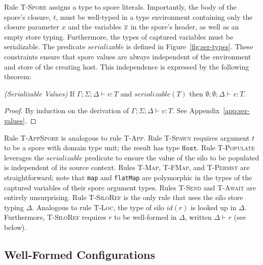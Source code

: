 Rule \textsc{T-Spore} assigns a type to spore literals. Importantly,
the body of the spore's closure, $t$, must be well-typed in a type
environment containing only the closure parameter $x$ and the
variables $\overline{x}$ in the spore's header, as well as an empty store
typing. Furthermore, the types of captured variables must be
serializable. The predicate $serializable$ is defined in
Figure~\ref{fig:ser-types}. These constraints ensure that spore values
are always independent of the environment and store of the creating
host. This independence is expressed by the following theorem:

\begin{thm}
\emph{(Serializable Values)}\label{lem:ser-values}
If $\Gamma ; \Sigma ; \Delta \vdash v : T$ and $serializable(T)$ then
$\emptyset ; \emptyset ; \Delta \vdash v : T$.
\end{thm}
\begin{proof}
By induction on the derivation of $\Gamma ; \Sigma ; \Delta \vdash v :
T$. See Appendix~\ref{app:ser-values}.
\end{proof}

Rule \textsc{T-AppSpore} is analogous to rule \textsc{T-App}. Rule
\textsc{T-Spawn} requires argument $t$ to be a spore with domain type
unit; the result has type $\texttt{Host}$.  Rule \textsc{T-Populate}
leverages the $serializable$ predicate to ensure the value of the silo
to be populated is independent of its source context. Rules
\textsc{T-Map}, \textsc{T-FMap}, and \textsc{T-Persist} are
straightforward; note that \verb|map| and \verb|flatMap| are
polymorphic in the types of the captured variables of their spore
argument types. Rules \textsc{T-Send} and \textsc{T-Await} are
entirely unsurprising. Rule \textsc{T-SiloRef} is the only rule that
uses the silo store typing $\Delta$. Analogous to rule \textsc{T-Loc},
the type of silo $id(r)$ is looked up in $\Delta$. Furthermore,
\textsc{T-SiloRef} requires $r$ to be well-formed in $\Delta$, written
$\Delta \vdash r$ (see below).

\subsection{Well-Formed Configurations}

